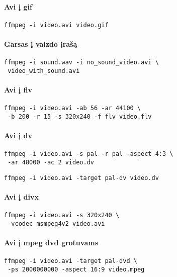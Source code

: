 \documentclass[11pt,a4paper]{article}
\begin{document}
\begin{multicols}{2}
  \paragraph{Avi į gif}
  \begin{verbatim}
ffmpeg -i video.avi video.gif
  \end{verbatim}

  \paragraph{Garsas į vaizdo įrašą}
  \begin{verbatim}
ffmpeg -i sound.wav -i no_sound_video.avi \
 video_with_sound.avi
  \end{verbatim}

  \paragraph{Avi į flv}
  \begin{verbatim}
ffmpeg -i video.avi -ab 56 -ar 44100 \
 -b 200 -r 15 -s 320x240 -f flv video.flv
  \end{verbatim}

  \paragraph{Avi į dv}
  \begin{verbatim}
ffmpeg -i video.avi -s pal -r pal -aspect 4:3 \
 -ar 48000 -ac 2 video.dv
  \end{verbatim}

  \begin{verbatim}
ffmpeg -i video.avi -target pal-dv video.dv
  \end{verbatim}

  \paragraph{Avi į divx}
  \begin{verbatim}
ffmpeg -i video.avi -s 320x240 \
 -vcodec msmpeg4v2 video.avi
  \end{verbatim}

  \paragraph{Avi į mpeg dvd grotuvams}
  \begin{verbatim}
ffmpeg -i video.avi -target pal-dvd \
 -ps 2000000000 -aspect 16:9 video.mpeg
  \end{verbatim}


\end{multicols}
\end{document}
